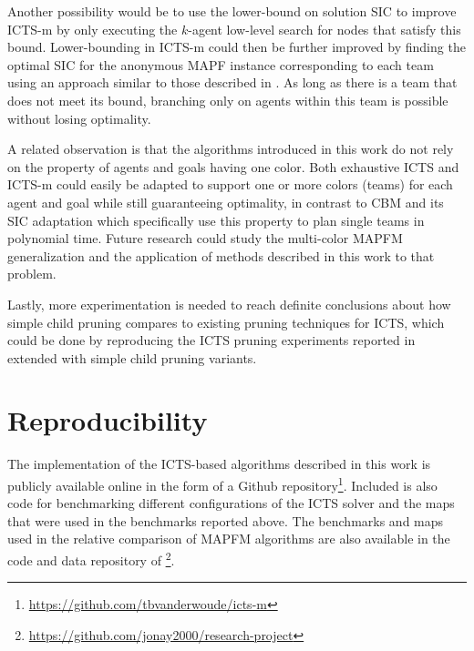 \documentclass[english]{article}
\begin{document}
	
	
	
	Another possibility would be to use the lower-bound on solution SIC to improve ICTS-m by only executing the $k$-agent low-level search for nodes that satisfy this bound. Lower-bounding in ICTS-m could then be further improved by finding the optimal SIC for the anonymous MAPF instance corresponding to each team using an approach similar to those described in \cite{baauw2021}. As long as there is a team that does not meet its bound, branching only on agents within this team is possible without losing optimality. 
	
	A related observation is that the algorithms introduced in this work do not rely on the property of agents and goals having one color. Both exhaustive ICTS and ICTS-m could easily be adapted to support one or more colors (teams) for each agent and goal while still guaranteeing optimality, in contrast to CBM \cite{ma2016} and its SIC adaptation \cite{baauw2021} which specifically use this property to plan single teams in polynomial time. Future research could study the multi-color MAPFM generalization and the application of methods described in this work to that problem. 
	
	Lastly, more experimentation is needed to reach definite conclusions about how simple child pruning compares to existing pruning techniques for ICTS, which could be done by reproducing the ICTS pruning experiments reported in \cite{sharon2011} extended with simple child pruning variants. 
	
	
	\section{Reproducibility}
	The implementation of the ICTS-based algorithms described in this work is publicly available online in the form of a Github repository\footnote{\url{https://github.com/tbvanderwoude/icts-m}}. Included is also code for benchmarking different configurations of the ICTS solver and the maps that were used in the benchmarks reported above. The benchmarks and maps used in the relative comparison of MAPFM algorithms are also available in the code and data repository of \cite{donszelmann2021}\footnote{\url{https://github.com/jonay2000/research-project}}.
	
\end{document}
